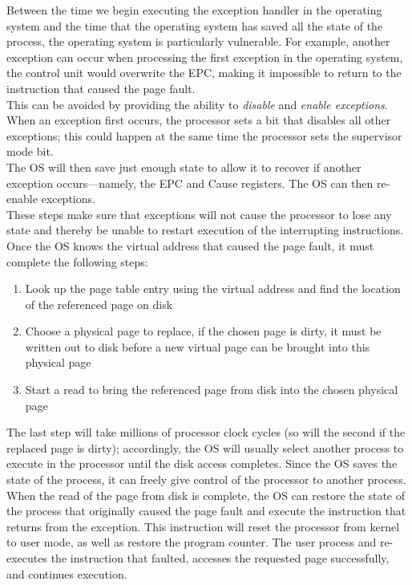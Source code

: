 \documentclass[12pt]{article}
\theoremstyle{definition}
\begin{document}
  Between the time we begin executing the exception handler in the operating system and the time that the operating system has saved all the state of the process, the operating system is particularly vulnerable.
  For example, another exception can occur when processing the first exception in the operating system, the control unit would overwrite the EPC, making it impossible to return to the instruction that caused the page fault. \\
  This can be avoided by providing the ability to \emph{disable} and \emph{enable exceptions}.
  When an exception first occurs, the processor sets a bit that disables all other exceptions;
  this could happen at the same time the processor sets the supervisor mode bit. \\
  The OS will then save just enough state to allow it to recover if another exception occurs---namely, the EPC and Cause registers.
  The OS can then re-enable exceptions. \\
  These steps make sure that exceptions will not cause the processor to lose any state and thereby be unable to restart execution of the interrupting instructions. \\

  Once the OS knows the virtual address that caused the page fault, it must complete the following steps:
  \begin{enumerate}
    \item Look up the page table entry using the virtual address and find the location of the referenced page on disk
    \item Choose a physical page to replace, if the chosen page is dirty, it must be written out to disk before a new virtual page can be brought into this physical page
    \item Start a read to bring the referenced page from disk into the chosen physical page
  \end{enumerate}

  The last step will take millions of processor clock cycles (so will the second if the replaced page is dirty);
  accordingly, the OS will usually select another process to execute in the processor until the disk access completes.
  Since the OS saves the state of the process, it can freely give control of the processor to another process. \\

  When the read of the page from disk is complete, the OS can restore the state of the process that originally caused the page fault and execute the instruction that returns from the exception.
  This instruction will reset the processor from kernel to user mode, as well as restore the program counter.
  The user process and re-executes the instruction that faulted, accesses the requested page successfully, and continues execution. \\
\end{document}
